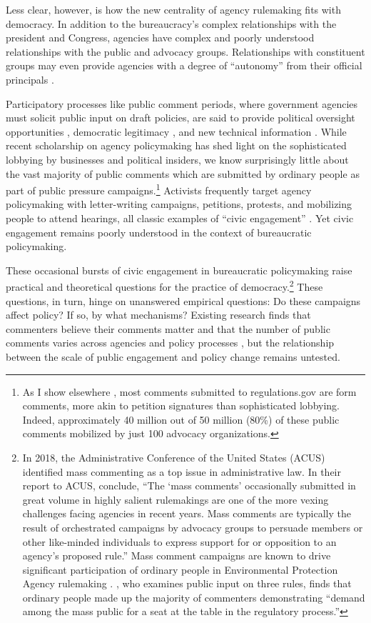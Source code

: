 \documentclass[
]{book}
\begin{document}
Less clear, however, is how the new centrality of agency rulemaking fits
with democracy. In addition to the bureaucracy's complex relationships with
the president and Congress, agencies have complex and poorly understood
relationships with the public and advocacy groups. Relationships with
constituent groups may even provide agencies with a degree of ``autonomy'' from their official principals \citep{Carpenter2001}.

Participatory processes like public comment periods, where government
agencies must solicit public input on draft policies, are said to
provide political oversight opportunities \citep{Balla1998, Mccubbins1984},
democratic legitimacy \citep{Croley2003, Rosenbloom2003}, and new technical
information \citep{Yackee2006JPART, Nelson2012}. While recent scholarship on
agency policymaking has shed light on the sophisticated lobbying by
businesses and political insiders, we know surprisingly little about the
vast majority of public comments which are submitted by ordinary people
as part of public pressure campaigns.\footnote{As I show elsewhere \citep{Judge-Lord2019}, most comments submitted to
  regulations.gov are form comments, more akin to petition signatures
  than sophisticated lobbying. Indeed, approximately 40 million out of
  50 million (80\%) of these public comments mobilized by just 100
  advocacy organizations.} Activists frequently target
agency policymaking with letter-writing campaigns, petitions, protests,
and mobilizing people to attend hearings, all classic examples of ``civic
engagement'' \citep{Verba1987}. Yet civic engagement remains poorly understood
in the context of bureaucratic policymaking.

These occasional bursts of civic engagement in bureaucratic policymaking
raise practical and theoretical questions for the practice of
democracy.\footnote{In 2018, the Administrative Conference of the United States (ACUS)
  identified mass commenting as a top issue in administrative law. In
  their report to ACUS, \citet{SantAmbrogio2018} conclude, ``The `mass
  comments' occasionally submitted in great volume in highly salient
  rulemakings are one of the more vexing challenges facing agencies in
  recent years. Mass comments are typically the result of orchestrated
  campaigns by advocacy groups to persuade members or other
  like-minded individuals to express support for or opposition to an
  agency's proposed rule.'' Mass comment campaigns are known to drive
  significant participation of ordinary people in Environmental
  Protection Agency rulemaking
  \citep{Judge-Lord2019, Potter2017, Balla2018}. \citet{Cuellar2005}, who
  examines public input on three rules, finds that ordinary people
  made up the majority of commenters demonstrating ``demand among the
  mass public for a seat at the table in the regulatory process.''} These questions, in turn, hinge on unanswered empirical
questions: Do these campaigns affect policy? If so, by what mechanisms?
Existing research finds that commenters believe their comments matter
\citep{Yackee2015JPART} and that the number of public comments varies across
agencies and policy processes
\citep{Judge-Lord2019, Libgober2018, Moore2017}, but the relationship
between the scale of public engagement and policy change remains
untested.
\end{document}
